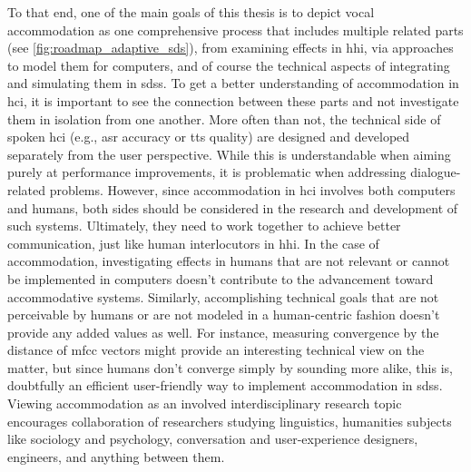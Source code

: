 To that end, one of the main goals of this thesis is to depict vocal accommodation as one comprehensive process that includes multiple related parts (see \cref{fig:roadmap_adaptive_sds}), from examining effects in \ac{hhi}, via approaches to model them for computers, and of course the technical aspects of integrating and simulating them in \acp{sds}.
To get a better understanding of accommodation in \ac{hci}, it is important to see the connection between these parts and not investigate them in isolation from one another.
More often than not, the technical side of spoken \ac{hci} (e.g., \ac{asr} accuracy or \ac{tts} quality) are designed and developed separately from the user perspective.
While this is understandable when aiming purely at performance improvements, it is problematic when addressing dialogue-related problems.
However, since accommodation in \ac{hci} involves both computers and humans, both sides should be considered in the research and development of such systems.
Ultimately, they need to work together to achieve better communication, just like human interlocutors in \ac{hhi}.
In the case of accommodation, investigating effects in humans that are not relevant or cannot be implemented in computers doesn't contribute to the advancement toward accommodative systems.
Similarly, accomplishing technical goals that are not perceivable by humans or are not modeled in a human-centric fashion doesn't provide any added values as well.
For instance, measuring convergence by the distance of \ac{mfcc} vectors \citep[as done by][]{Han2018you} might provide an interesting technical view on the matter, but since humans don't converge simply by sounding more alike, this is, doubtfully an efficient user-friendly way to implement accommodation in \acp{sds}.
Viewing accommodation as an involved interdisciplinary research topic encourages collaboration of researchers studying linguistics, humanities subjects like sociology and psychology, conversation and user-experience designers, engineers, and anything between them.

